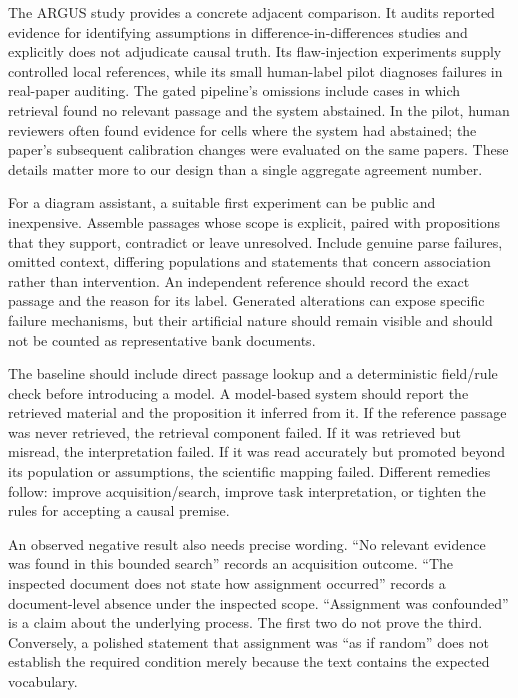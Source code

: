 The ARGUS study provides a concrete adjacent comparison. It audits
reported evidence for identifying assumptions in
difference-in-differences studies and explicitly does not adjudicate
causal truth. Its flaw-injection experiments supply controlled local
references, while its small human-label pilot diagnoses failures in
real-paper auditing. The gated pipeline's omissions include cases in
which retrieval found no relevant passage and the system abstained. In
the pilot, human reviewers often found evidence for cells where the
system had abstained; the paper's subsequent calibration changes were
evaluated on the same papers. These details matter more to our design
than a single aggregate agreement number. \citep{v12_la_2609_30867}

For a diagram assistant, a suitable first experiment can be public and
inexpensive. Assemble passages whose scope is explicit, paired with
propositions that they support, contradict or leave unresolved. Include
genuine parse failures, omitted context, differing populations and
statements that concern association rather than intervention. An
independent reference should record the exact passage and the reason for
its label. Generated alterations can expose specific failure mechanisms,
but their artificial nature should remain visible and should not be
counted as representative bank documents.

The baseline should include direct passage lookup and a deterministic
field/rule check before introducing a model. A model-based system should
report the retrieved material and the proposition it inferred from it.
If the reference passage was never retrieved, the retrieval component
failed. If it was retrieved but misread, the interpretation failed. If
it was read accurately but promoted beyond its population or
assumptions, the scientific mapping failed. Different remedies follow:
improve acquisition/search, improve task interpretation, or tighten the
rules for accepting a causal premise.

An observed negative result also needs precise wording. ``No relevant
evidence was found in this bounded search'' records an acquisition
outcome. ``The inspected document does not state how assignment
occurred'' records a document-level absence under the inspected scope.
``Assignment was confounded'' is a claim about the underlying process.
The first two do not prove the third. Conversely, a polished statement
that assignment was ``as if random'' does not establish the required
condition merely because the text contains the expected vocabulary.

